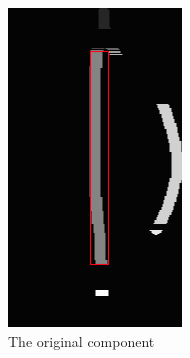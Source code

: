 \begin{figure}[H]
\begin{subfigure}[b]{.2\linewidth}
      \includegraphics[width=\linewidth]{gfx/techniques/stem-detection-3.png}
      \caption{The original component}
      \label{fig:stem-segmentation-3}
  \end{subfigure}
  \begin{subfigure}[b]{.2\linewidth}
      \centering

\end{subfigure}
\end{figure}
